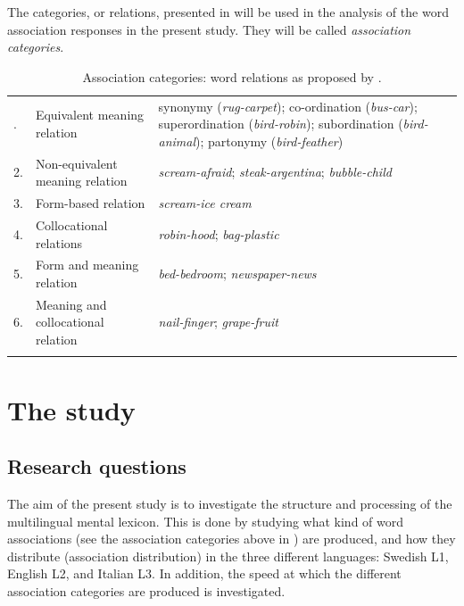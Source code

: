 \documentclass[output=paper,colorlinks,citecolor=brown,nonflat]{langsci/langscibook}
\begin{document}
The categories, or relations, presented in  will be used in the analysis of the word association responses in the present study. They will be called \textit{association categories}.

\begin{table}
    \begin{tabularx}{\textwidth}{llQ}
    . & Equivalent meaning relation & synonymy (\textit{rug-carpet}); co-ordination (\textit{bus-car}); superordination (\textit{bird-robin}); subordination (\textit{bird-animal}); partonymy (\textit{bird-feather})\\
         2. & Non-equivalent meaning relation & \textit{scream-afraid}; \textit{steak-argentina}; \textit{bubble-child}\\
         3. & Form-based relation & \textit{scream-ice cream}\\
         4. & Collocational relations & \textit{robin-hood}; \textit{bag-plastic}\\
         5. & Form and meaning relation & \textit{bed-bedroom}; \textit{newspaper-news}\\
         6. & Meaning and collocational relation & \textit{nail-finger}; \textit{grape-fruit}\\
    \lspbottomrule
    \end{tabularx}
    \caption{Association categories: word relations as proposed by \citet{FitzpatrickIzura2011}.}
    \label{tab:gudmundson:1}
\end{table}

\section{The study}\label{sec:gudmundson:2}

\subsection{Research questions}\label{sec:gudmundson:2.1}

The aim of the present study is to investigate the structure and processing of the multilingual mental lexicon. This is done by studying what kind of word associations (see the association categories above in ) are produced, and how they distribute (association distribution) in the three different languages: Swedish L1, English L2, and Italian L3. In addition, the speed at which the different association categories are produced is investigated.
\end{document}
